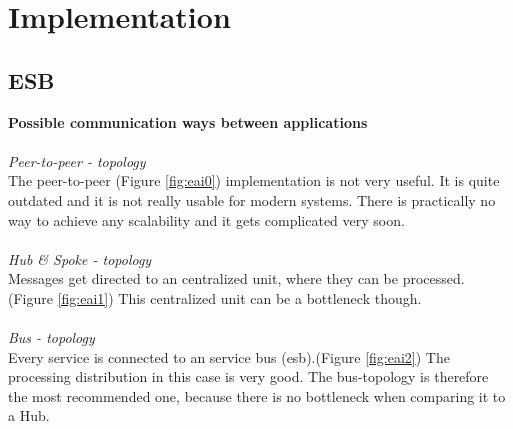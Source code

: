 \documentclass[12pt]{article}
\begin{document}

\newpage

\section{Implementation}
\subsection{ESB}
\label{sec:esb}
\textbf{Possible communication ways between applications} \\ \\
\textit{Peer-to-peer - topology}\\
The peer-to-peer (Figure \ref{fig:eai0}) implementation is not very useful. It is quite outdated and it is not really usable for modern systems.
There is practically no way to achieve any scalability and it gets complicated very soon. \\\\
\textit{Hub \& Spoke  - topology}\\
Messages get directed to an centralized unit, where they can be processed. (Figure \ref{fig:eai1}) This centralized unit can be a bottleneck though. \\\\
\textit{Bus - topology}\\
Every service is connected to an service bus (\gls{esb}).(Figure \ref{fig:eai2}) The processing distribution in this case is very good. The bus-topology is therefore the most recommended one, because there is no bottleneck when comparing it to a Hub.
\end{document}
